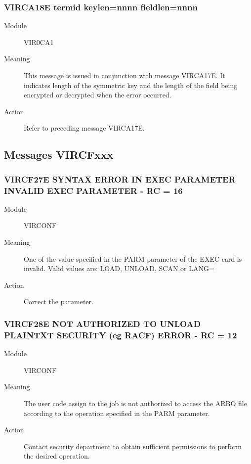 \documentclass[letterpaper,10pt,english]{sphinxmanual}
\begin{document}
\subsubsection{VIRCA18E termid keylen=nnnn fieldlen=nnnn}
\label{\detokenize{messages:virca18e-termid-keylen-nnnn-fieldlen-nnnn}}\begin{description}
\item[{Module}] \leavevmode
VIR0CA1

\item[{Meaning}] \leavevmode
This message is issued in conjunction with message VIRCA17E. It indicates length of the symmetric key and the length of the field being encrypted or decrypted when the error occurred.

\item[{Action}] \leavevmode
Refer to preceding message VIRCA17E.

\end{description}


\subsection{Messages VIRCFxxx}
\label{\detokenize{messages:messages-vircfxxx}}

\subsubsection{VIRCF27E SYNTAX ERROR IN EXEC PARAMETER INVALID EXEC PARAMETER - RC = 16}
\label{\detokenize{messages:vircf27e-syntax-error-in-exec-parameter-invalid-exec-parameter-rc-16}}\begin{description}
\item[{Module}] \leavevmode
VIRCONF

\item[{Meaning}] \leavevmode
One of the value specified in the PARM parameter of the EXEC card is invalid. Valid values are: LOAD, UNLOAD, SCAN or LANG=

\item[{Action}] \leavevmode
Correct the parameter.

\end{description}


\subsubsection{VIRCF28E NOT AUTHORIZED TO UNLOAD PLAINTXT SECURITY (eg RACF) ERROR - RC = 12}
\label{\detokenize{messages:vircf28e-not-authorized-to-unload-plaintxt-security-eg-racf-error-rc-12}}\begin{description}
\item[{Module}] \leavevmode
VIRCONF

\item[{Meaning}] \leavevmode
The user code assign to the job is not authorized to access the ARBO file according to the operation specified in the PARM parameter.

\item[{Action}] \leavevmode
Contact security department to obtain sufficient permissions to perform the desired operation.

\end{description}
\end{document}
